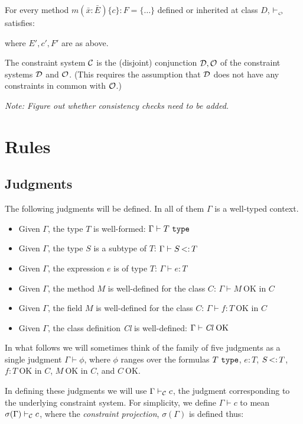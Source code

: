 \documentclass[preprint,nocopyrightspace,9pt]{sigplanconf}
\def\mtype{\mbox{\tt mtype}}
\begin{document}
For every method
$m(\bar{x}:\bar{E})\{c\}:F=\{\ldots\}$ defined or inherited at class $D$,
$\vdash_{\cal_O}$ satisfies:

\infax[mtype]{\Gamma,z:D\{d\} \vdash_{\cal O} \mtype(z, m, \bar{x}:\bar{E'},c'\rightarrow F')}

\noindent where $E',c',F'$ are as above.

The constraint system $\cal C$ is the (disjoint) conjunction $\cal
D,O$ of the constraint systems $\cal D$ and $\cal O$. (This requires
the assumption that $\cal D$ does not have any constraints in common
with $\cal O$.)

{\em Note: Figure out whether consistency checks need to be added.}

\section{Rules}

\subsection{Judgments}

The following judgments will be defined. In all of them $\Gamma$ is a
well-typed context.
\begin{itemize}
  \item Given $\Gamma$, the type $T$ is well-formed: $\Gamma \vdash T
  \ {\tt type}$
  \item Given $\Gamma$, the type $S$ is a subtype of $T$: $\Gamma \vdash S \subtype T$
  \item Given $\Gamma$, the expression $e$ is of type $T$: $\Gamma
  \vdash e:T$
  \item Given $\Gamma$, the method $M$ is well-defined for the class $C$: 
  $\Gamma \vdash M\ \mbox{OK in $C$}$
  \item Given $\Gamma$, the field $M$ is well-defined for the class $C$:
    $\Gamma \vdash f:T\ \mbox{OK in $C$}$
  \item Given $\Gamma$, the class definition \mbox{\em Cl} is well-defined: $\Gamma \vdash \mbox{{\em Cl}\ OK}$
\end{itemize}


In what follows we will sometimes think of the family of five
judgments as a single judgment $\Gamma \vdash \phi$, where $\phi$
ranges over the formulas $T\ \tt type$, $e:T$, $S \subtype T$, $f:T\
\mbox{OK in $C$}$, $M\ \mbox{OK in $C$}$, and $C\ \mbox{OK}$.

In defining these judgments we will use $\Gamma \vdash_{\cal C} c$,
the judgment corresponding to the underlying constraint system. For simplicity,
we define $\Gamma \vdash c$ to mean $\sigma(\Gamma)\vdash_{\cal C} c$,
where the {\em constraint projection}, $\sigma(\Gamma)$ is defined thus:
\end{document}
